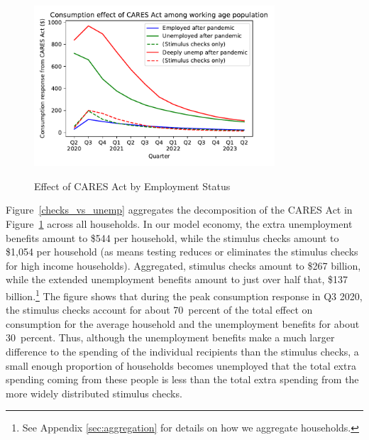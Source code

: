\documentclass[titlepage]{\econtex}
\begin{document}
\begin{figure}
  \centering
  \caption{Effect of CARES Act by Employment Status}
  \label{stim_by_emp}
  { \includegraphics[width=0.8\textwidth]{./Figures/ConDeltaByEmpState}}
\end{figure}

Figure~\ref{checks_vs_unemp} aggregates the decomposition of the CARES Act in Figure~\ref{stim_by_emp} across all households.
In our model economy, the extra unemployment benefits amount to \$544 per household, while the stimulus checks amount to \$1,054 per household (as means testing reduces or eliminates the stimulus checks for high income households).
Aggregated, stimulus checks amount to \$267 billion, while the extended unemployment benefits amount to just over half that, \$137 billion.\footnote{See Appendix \ref{sec:aggregation} for details on how we aggregate households.}
The figure shows that during the peak consumption response in Q3 2020, the stimulus checks account for about 70~percent of the total effect on consumption for the average household and the unemployment benefits for about 30~percent.  Thus, although the unemployment benefits make a much larger difference to the spending of the individual recipients than the stimulus checks, a small enough proportion of households becomes unemployed that the total extra spending coming from these people is less than the total extra spending from the more widely distributed stimulus checks.
\end{document}
